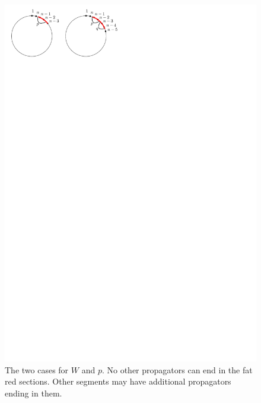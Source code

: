 \documentclass[11pt]{article}
\theoremstyle{remark}
\theoremstyle{definition}
\begin{document}
\begin{figure}
 \includegraphics{specialp}
  \caption{The two cases for $W$ and $p$.  No other propagators can end in the fat red sections.  Other segments may have additional propagators ending in them.}\label{fig special p}
\end{figure}
\end{document}
